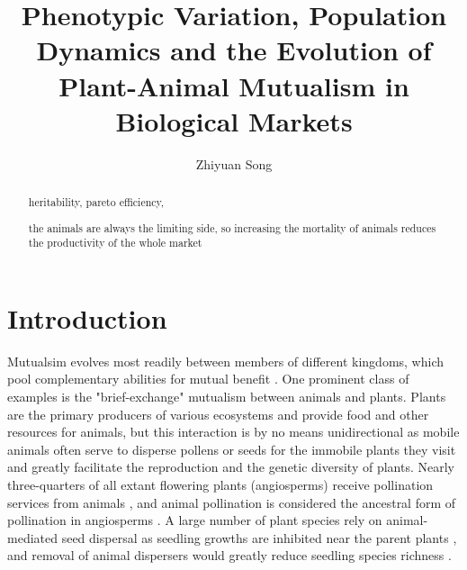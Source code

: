 \documentclass[12pt]{article}
\begin{document}
\title{Phenotypic Variation, Population Dynamics and the Evolution of Plant-Animal Mutualism in Biological Markets}
\author{Zhiyuan Song}
\date{}
\maketitle
\setlength{\parskip}{.15in}

\begin{abstract}

heritability, pareto efficiency, 

the animals are always the limiting side, so increasing the mortality of animals reduces the productivity of the whole market 

\end{abstract}


\section*{Introduction}

Mutualsim evolves most readily between members of different kingdoms, which pool complementary abilities for mutual benefit \citep{LeighJr2010}. One prominent class of examples is the "brief-exchange" mutualism between animals and plants. Plants are the primary producers of various ecosystems and provide food and other resources for animals, but this interaction is by no means unidirectional as mobile animals often serve to disperse pollens or seeds for the immobile plants they visit and greatly facilitate the reproduction and the genetic diversity of plants. Nearly three-quarters of all extant flowering plants (angiosperms) receive pollination services from animals \citep{NationalResearchCouncil2007}, and animal pollination is considered the ancestral form of pollination in angiosperms \citep{Hu2008}. A large number of plant species rely on animal-mediated seed dispersal as seedling growths are inhibited near the parent plants \citep{Howe1982}, and removal of animal dispersers would greatly reduce seedling species richness \citep{Wang2002}.
\end{document}
